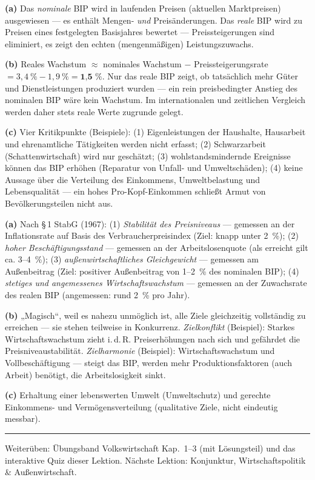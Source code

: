 \documentclass[11pt, a4paper]{article}
\begin{document}
\begin{loesung}[title={Lösung Aufgabe~8 --- Nominales/reales BIP und Grenzen}]
\textbf{(a)} Das \emph{nominale} BIP wird in laufenden Preisen (aktuellen Marktpreisen)
ausgewiesen --- es enthält Mengen- \emph{und} Preisänderungen. Das \emph{reale} BIP wird
zu Preisen eines festgelegten Basisjahres bewertet --- Preissteigerungen sind eliminiert,
es zeigt den echten (mengenmäßigen) Leistungszuwachs.

\textbf{(b)} Reales Wachstum $\approx$ nominales Wachstum $-$ Preissteigerungsrate
$= 3{,}4~\% - 1{,}9~\% = \textbf{1{,}5~\%}$. Nur das reale BIP zeigt, ob tatsächlich mehr
Güter und Dienstleistungen produziert wurden --- ein rein preisbedingter Anstieg des
nominalen BIP wäre kein Wachstum. Im internationalen und zeitlichen Vergleich werden
daher stets reale Werte zugrunde gelegt.

\textbf{(c)} Vier Kritikpunkte (Beispiele): (1) Eigenleistungen der Haushalte, Hausarbeit
und ehrenamtliche Tätigkeiten werden nicht erfasst; (2) Schwarzarbeit
(Schattenwirtschaft) wird nur geschätzt; (3) wohlstandsmindernde Ereignisse können das
BIP erhöhen (Reparatur von Unfall- und Umweltschäden); (4) keine Aussage über die
Verteilung des Einkommens, Umweltbelastung und Lebensqualität --- ein hohes
Pro-Kopf-Einkommen schließt Armut von Bevölkerungsteilen nicht aus.
\end{loesung}

\begin{loesung}[title={Lösung Aufgabe~9 --- Magisches Viereck und Verteilungspolitik}]
\textbf{(a)} Nach \S\,1 StabG (1967): (1) \emph{Stabilität des Preisniveaus} ---
gemessen an der Inflationsrate auf Basis des Verbraucherpreisindex (Ziel: knapp unter
2~\%); (2) \emph{hoher Beschäftigungsstand} --- gemessen an der Arbeitslosenquote (als
erreicht gilt ca. 3--4~\%); (3) \emph{außenwirtschaftliches Gleichgewicht} --- gemessen
am Außenbeitrag (Ziel: positiver Außenbeitrag von 1--2~\% des nominalen BIP);
(4) \emph{stetiges und angemessenes Wirtschaftswachstum} --- gemessen an der Zuwachsrate
des realen BIP (angemessen: rund 2~\% pro Jahr).

\textbf{(b)} „Magisch``, weil es nahezu unmöglich ist, alle Ziele gleichzeitig
vollständig zu erreichen --- sie stehen teilweise in Konkurrenz. \emph{Zielkonflikt}
(Beispiel): Starkes Wirtschaftswachstum zieht i.\,d.\,R. Preiserhöhungen nach sich und
gefährdet die Preisniveaustabilität. \emph{Zielharmonie} (Beispiel): Wirtschaftswachstum
und Vollbeschäftigung --- steigt das BIP, werden mehr Produktionsfaktoren (auch Arbeit)
benötigt, die Arbeitslosigkeit sinkt.

\textbf{(c)} Erhaltung einer lebenswerten Umwelt (Umweltschutz) und gerechte
Einkommens- und Vermögensverteilung (qualitative Ziele, nicht eindeutig messbar).
\end{loesung}

\vspace{1em}
\hrule
\vspace{0.8em}
\noindent\textsf{\small Weiterüben: Übungsband Volkswirtschaft Kap.~1--3 (mit Lösungsteil) und das
interaktive Quiz dieser Lektion. Nächste Lektion: Konjunktur, Wirtschaftspolitik \& Außenwirtschaft.}
\end{document}
